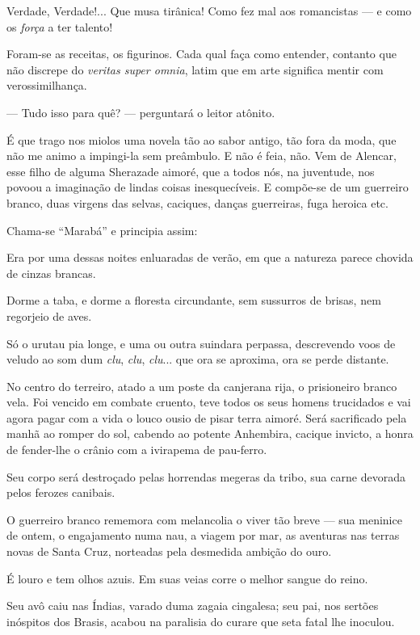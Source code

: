 Verdade, Verdade!... Que musa tirânica! Como fez mal aos romancistas ---
e como os \emph{força} a ter talento!

Foram-se as receitas, os figurinos. Cada qual faça como entender,
contanto que não discrepe do \emph{veritas super omnia}, latim que em
arte significa mentir com verossimilhança.

--- Tudo isso para quê? --- perguntará o leitor atônito.

É que trago nos miolos uma novela tão ao sabor antigo, tão fora da moda,
que não me animo a impingi-la sem preâmbulo. E não é feia, não. Vem de
Alencar, esse filho de alguma Sherazade aimoré, que a todos nós, na
juventude, nos povoou a imaginação de lindas coisas inesquecíveis. E
compõe-se de um guerreiro branco, duas virgens das selvas, caciques,
danças guerreiras, fuga heroica etc.

Chama-se ``Marabá'' e principia assim:

Era por uma dessas noites enluaradas de verão, em que a natureza parece
chovida de cinzas brancas.

Dorme a taba, e dorme a floresta circundante, sem sussurros de brisas,
nem regorjeio de aves.

Só o urutau pia longe, e uma ou outra suindara perpassa, descrevendo
voos de veludo ao som dum \emph{clu}, \emph{clu}, \emph{clu}... que ora
se aproxima, ora se perde distante.

No centro do terreiro, atado a um poste da canjerana rija, o prisioneiro
branco vela. Foi vencido em combate cruento, teve todos os seus homens
trucidados e vai agora pagar com a vida o louco ousio de pisar terra
aimoré. Será sacrificado pela manhã ao romper do sol, cabendo ao potente
Anhembira, cacique invicto, a honra de fender-lhe o crânio com a
ivirapema de pau-ferro.

Seu corpo será destroçado pelas horrendas megeras da tribo, sua carne
devorada pelos ferozes canibais.

O guerreiro branco rememora com melancolia o viver tão breve --- sua
meninice de ontem, o engajamento numa nau, a viagem por mar, as
aventuras nas terras novas de Santa Cruz, norteadas pela desmedida
ambição do ouro.

É louro e tem olhos azuis. Em suas veias corre o melhor sangue do reino.

Seu avô caiu nas Índias, varado duma zagaia cingalesa; seu pai, nos
sertões inóspitos dos Brasis, acabou na paralisia do curare que seta
fatal lhe inoculou.

